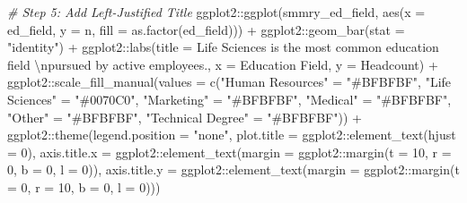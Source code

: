 \documentclass[
]{book}
\newenvironment{Shaded}{\begin{snugshade}}{\end{snugshade}}
\newcommand{\AttributeTok}[1]{\textcolor[rgb]{0.77,0.63,0.00}{#1}}
\newcommand{\CommentTok}[1]{\textcolor[rgb]{0.56,0.35,0.01}{\textit{#1}}}
\newcommand{\DecValTok}[1]{\textcolor[rgb]{0.00,0.00,0.81}{#1}}
\newcommand{\FunctionTok}[1]{\textcolor[rgb]{0.00,0.00,0.00}{#1}}
\newcommand{\NormalTok}[1]{#1}
\newcommand{\OtherTok}[1]{\textcolor[rgb]{0.56,0.35,0.01}{#1}}
\newcommand{\SpecialCharTok}[1]{\textcolor[rgb]{0.00,0.00,0.00}{#1}}
\newcommand{\StringTok}[1]{\textcolor[rgb]{0.31,0.60,0.02}{#1}}
\begin{document}
\begin{Shaded}
\begin{Highlighting}[]
\CommentTok{\# Step 5: Add Left{-}Justified Title}
\NormalTok{ggplot2}\SpecialCharTok{::}\FunctionTok{ggplot}\NormalTok{(smmry\_ed\_field, }\FunctionTok{aes}\NormalTok{(}\AttributeTok{x =}\NormalTok{ ed\_field, }\AttributeTok{y =}\NormalTok{ n, }\AttributeTok{fill =} \FunctionTok{as.factor}\NormalTok{(ed\_field))) }\SpecialCharTok{+}
\NormalTok{ggplot2}\SpecialCharTok{::}\FunctionTok{geom\_bar}\NormalTok{(}\AttributeTok{stat =} \StringTok{"identity"}\NormalTok{) }\SpecialCharTok{+}
\NormalTok{ggplot2}\SpecialCharTok{::}\FunctionTok{labs}\NormalTok{(}\AttributeTok{title =} \StringTok{\textquotesingle{}Life Sciences is the most common education field }\SpecialCharTok{\textbackslash{}n}\StringTok{pursued by active employees.\textquotesingle{}}\NormalTok{, }\AttributeTok{x =} \StringTok{\textquotesingle{}Education Field\textquotesingle{}}\NormalTok{, }\AttributeTok{y =} \StringTok{\textquotesingle{}Headcount\textquotesingle{}}\NormalTok{) }\SpecialCharTok{+}
\NormalTok{ggplot2}\SpecialCharTok{::}\FunctionTok{scale\_fill\_manual}\NormalTok{(}\AttributeTok{values =} \FunctionTok{c}\NormalTok{(}\StringTok{"Human Resources"} \OtherTok{=} \StringTok{"\#BFBFBF"}\NormalTok{, }
                                      \StringTok{"Life Sciences"} \OtherTok{=} \StringTok{"\#0070C0"}\NormalTok{, }
                                      \StringTok{"Marketing"} \OtherTok{=} \StringTok{"\#BFBFBF"}\NormalTok{, }
                                      \StringTok{"Medical"} \OtherTok{=} \StringTok{"\#BFBFBF"}\NormalTok{,}
                                      \StringTok{"Other"} \OtherTok{=} \StringTok{"\#BFBFBF"}\NormalTok{,}
                                      \StringTok{"Technical Degree"} \OtherTok{=} \StringTok{"\#BFBFBF"}\NormalTok{)) }\SpecialCharTok{+}
\NormalTok{ggplot2}\SpecialCharTok{::}\FunctionTok{theme}\NormalTok{(}\AttributeTok{legend.position =} \StringTok{"none"}\NormalTok{,}
               \AttributeTok{plot.title =}\NormalTok{ ggplot2}\SpecialCharTok{::}\FunctionTok{element\_text}\NormalTok{(}\AttributeTok{hjust =} \DecValTok{0}\NormalTok{),}
               \AttributeTok{axis.title.x =}\NormalTok{ ggplot2}\SpecialCharTok{::}\FunctionTok{element\_text}\NormalTok{(}\AttributeTok{margin =}\NormalTok{ ggplot2}\SpecialCharTok{::}\FunctionTok{margin}\NormalTok{(}\AttributeTok{t =} \DecValTok{10}\NormalTok{, }\AttributeTok{r =} \DecValTok{0}\NormalTok{, }\AttributeTok{b =} \DecValTok{0}\NormalTok{, }\AttributeTok{l =} \DecValTok{0}\NormalTok{)),}
               \AttributeTok{axis.title.y =}\NormalTok{ ggplot2}\SpecialCharTok{::}\FunctionTok{element\_text}\NormalTok{(}\AttributeTok{margin =}\NormalTok{ ggplot2}\SpecialCharTok{::}\FunctionTok{margin}\NormalTok{(}\AttributeTok{t =} \DecValTok{0}\NormalTok{, }\AttributeTok{r =} \DecValTok{10}\NormalTok{, }\AttributeTok{b =} \DecValTok{0}\NormalTok{, }\AttributeTok{l =} \DecValTok{0}\NormalTok{)))}


\end{Highlighting}
\end{Shaded}
\end{document}
